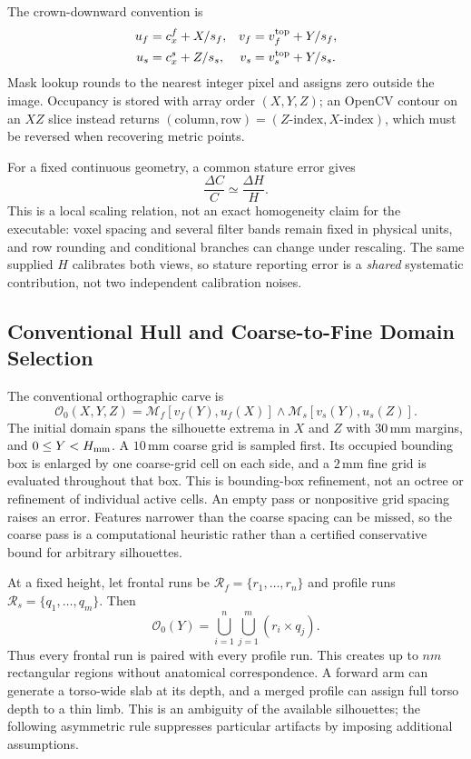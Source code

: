 \documentclass[journal]{IEEEtran}
\begin{document}
The crown-downward convention is
\begin{align}
u_f&=c_x^f+X/s_f,&v_f&=v_f^{\rm top}+Y/s_f,\nonumber\\
u_s&=c_x^s+Z/s_s,&v_s&=v_s^{\rm top}+Y/s_s.
\label{eq:projection_coordinates}
\end{align}
Mask lookup rounds to the nearest integer pixel and assigns zero outside the image. Occupancy is stored with array order $(X,Y,Z)$; an OpenCV contour on an $XZ$ slice instead returns $(\text{column},\text{row})=(Z\text{-index},X\text{-index})$, which must be reversed when recovering metric points.

For a fixed continuous geometry, a common stature error gives
\begin{equation}
\frac{\Delta C}{C}\simeq\frac{\Delta H}{H}.
\label{eq:scale_prop}
\end{equation}
This is a local scaling relation, not an exact homogeneity claim for the executable: voxel spacing and several filter bands remain fixed in physical units, and row rounding and conditional branches can change under rescaling. The same supplied $H$ calibrates both views, so stature reporting error is a \emph{shared} systematic contribution, not two independent calibration noises.

\subsection{Conventional Hull and Coarse-to-Fine Domain Selection}
\label{subsec:carving}
The conventional orthographic carve is
\begin{equation}
\mathcal O_0(X,Y,Z)=\mathcal M_f[v_f(Y),u_f(X)]\wedge\mathcal M_s[v_s(Y),u_s(Z)].
\label{eq:cartesian_carve}
\end{equation}
The initial domain spans the silhouette extrema in $X$ and $Z$ with $30$\,mm margins, and $0\le Y<H_{\rm mm}$. A $10$\,mm coarse grid is sampled first. Its occupied bounding box is enlarged by one coarse-grid cell on each side, and a $2$\,mm fine grid is evaluated throughout that box. This is bounding-box refinement, not an octree or refinement of individual active cells. An empty pass or nonpositive grid spacing raises an error. Features narrower than the coarse spacing can be missed, so the coarse pass is a computational heuristic rather than a certified conservative bound for arbitrary silhouettes.

At a fixed height, let frontal runs be $\mathcal R_f=\{r_1,\ldots,r_n\}$ and profile runs $\mathcal R_s=\{q_1,\ldots,q_m\}$. Then
\begin{equation}
\mathcal O_0(Y)=\bigcup_{i=1}^n\bigcup_{j=1}^m(r_i\times q_j).
\end{equation}
Thus every frontal run is paired with every profile run. This creates up to $nm$ rectangular regions without anatomical correspondence. A forward arm can generate a torso-wide slab at its depth, and a merged profile can assign full torso depth to a thin limb. This is an ambiguity of the available silhouettes; the following asymmetric rule suppresses particular artifacts by imposing additional assumptions.
\end{document}
